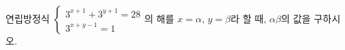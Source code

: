 연립방정식 $\begin{cases} 3^{x+1}+3^{y+1}=28 \\ 3^{x+y-1}=1 \end{cases}$의 해를 $x=\alpha$, $y=\beta$라 할 때, $\alpha\beta$의 값을 구하시오.
